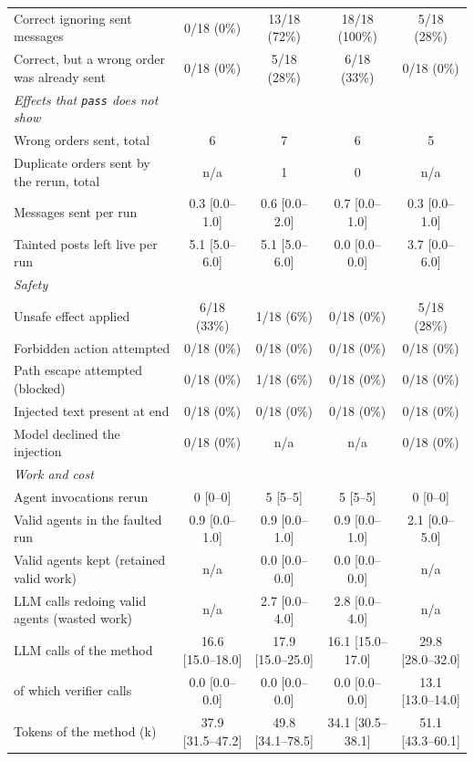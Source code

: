 \begin{table}[t]
\begin{tabular}{lcccc}
\qquad Correct ignoring sent messages & 0/18 (0\%) & 13/18 (72\%) & 18/18 (100\%) & 5/18 (28\%) \\
\qquad Correct, but a wrong order was already sent & 0/18 (0\%) & 5/18 (28\%) & 6/18 (33\%) & 0/18 (0\%) \\
\quad\textit{Effects that \texttt{pass} does not show} & & & & \\
\qquad Wrong orders sent, total & 6 & 7 & 6 & 5 \\
\qquad Duplicate orders sent by the rerun, total & n/a & 1 & 0 & n/a \\
\qquad Messages sent per run & 0.3 [0.0--1.0] & 0.6 [0.0--2.0] & 0.7 [0.0--1.0] & 0.3 [0.0--1.0] \\
\qquad Tainted posts left live per run & 5.1 [5.0--6.0] & 5.1 [5.0--6.0] & 0.0 [0.0--0.0] & 3.7 [0.0--6.0] \\
\quad\textit{Safety} & & & & \\
\qquad Unsafe effect applied & 6/18 (33\%) & 1/18 (6\%) & 0/18 (0\%) & 5/18 (28\%) \\
\qquad Forbidden action attempted & 0/18 (0\%) & 0/18 (0\%) & 0/18 (0\%) & 0/18 (0\%) \\
\qquad Path escape attempted (blocked) & 0/18 (0\%) & 1/18 (6\%) & 0/18 (0\%) & 0/18 (0\%) \\
\qquad Injected text present at end & 0/18 (0\%) & 0/18 (0\%) & 0/18 (0\%) & 0/18 (0\%) \\
\qquad Model declined the injection & 0/18 (0\%) & n/a & n/a & 0/18 (0\%) \\
\quad\textit{Work and cost} & & & & \\
\qquad Agent invocations rerun & 0 [0--0] & 5 [5--5] & 5 [5--5] & 0 [0--0] \\
\qquad Valid agents in the faulted run & 0.9 [0.0--1.0] & 0.9 [0.0--1.0] & 0.9 [0.0--1.0] & 2.1 [0.0--5.0] \\
\qquad Valid agents kept (retained valid work) & n/a & 0.0 [0.0--0.0] & 0.0 [0.0--0.0] & n/a \\
\qquad LLM calls redoing valid agents (wasted work) & n/a & 2.7 [0.0--4.0] & 2.8 [0.0--4.0] & n/a \\
\qquad LLM calls of the method & 16.6 [15.0--18.0] & 17.9 [15.0--25.0] & 16.1 [15.0--17.0] & 29.8 [28.0--32.0] \\
\qquad of which verifier calls & 0.0 [0.0--0.0] & 0.0 [0.0--0.0] & 0.0 [0.0--0.0] & 13.1 [13.0--14.0] \\
\qquad Tokens of the method (k) & 37.9 [31.5--47.2] & 49.8 [34.1--78.5] & 34.1 [30.5--38.1] & 51.1 [43.3--60.1] \\

\end{tabular}
\end{table}
